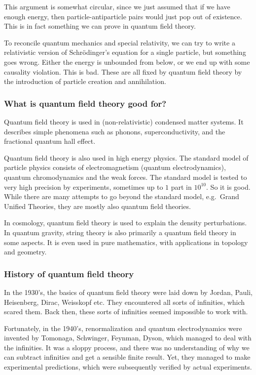 \documentclass[a4paper]{article}
\begin{document}
This argument is somewhat circular, since we just assumed that if we have enough energy, then particle-antiparticle pairs would just pop out of existence. This is in fact something we can prove in quantum field theory.

To reconcile quantum mechanics and special relativity, we can try to write a relativistic version of Schr\"odinger's equation for a single particle, but something goes wrong. Either the energy is unbounded from below, or we end up with some causality violation. This is bad. These are all fixed by quantum field theory by the introduction of particle creation and annihilation.

\subsubsection*{What is quantum field theory good for?}
Quantum field theory is used in (non-relativistic) condensed matter systems. It describes simple phenomena such as phonons, superconductivity, and the fractional quantum hall effect.

Quantum field theory is also used in high energy physics. The standard model of particle physics consists of electromagnetism (quantum electrodynamics), quantum chromodynamics and the weak forces. The standard model is tested to very high precision by experiments, sometimes up to $1$ part in $10^{10}$. So it is good. While there are many attempts to go beyond the standard model, e.g.\ Grand Unified Theories, they are mostly also quantum field theories.

In cosmology, quantum field theory is used to explain the density perturbations. In quantum gravity, string theory is also primarily a quantum field theory in some aspects. It is even used in pure mathematics, with applications in topology and geometry.

\subsubsection*{History of quantum field theory}
In the 1930's, the basics of quantum field theory were laid down by Jordan, Pauli, Heisenberg, Dirac, Weisskopf etc. They encountered all sorts of infinities, which scared them. Back then, these sorts of infinities seemed impossible to work with.

Fortunately, in the 1940's, renormalization and quantum electrodynamics were invented by Tomonaga, Schwinger, Feynman, Dyson, which managed to deal with the infinities. It was a sloppy process, and there was no understanding of why we can subtract infinities and get a sensible finite result. Yet, they managed to make experimental predictions, which were subsequently verified by actual experiments.
\end{document}
